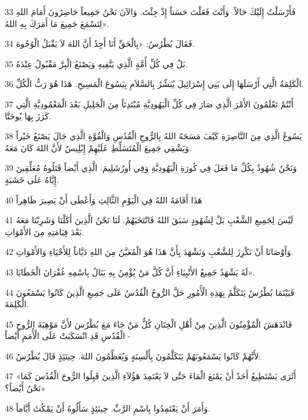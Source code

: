 \par 33 فَأَرْسَلْتُ إِلَيْكَ حَالاً. وَأَنْتَ فَعَلْتَ حَسَناً إِذْ جِئْتَ. وَالآنَ نَحْنُ جَمِيعاً حَاضِرُونَ أَمَامَ اللهِ لِنَسْمَعَ جَمِيعَ مَا أَمَرَكَ بِهِ اللهُ».
\par 34 فَقَالَ بُطْرُسُ: «بِالْحَقِّ أَنَا أَجِدُ أَنَّ اللهَ لاَ يَقْبَلُ الْوُجُوهَ.
\par 35 بَلْ فِي كُلِّ أُمَّةٍ الَّذِي يَتَّقِيهِ وَيَصْنَعُ الْبِرَّ مَقْبُولٌ عِنْدَهُ.
\par 36 الْكَلِمَةُ الَّتِي أَرْسَلَهَا إِلَى بَنِي إِسْرَائِيلَ يُبَشِّرُ بِالسَّلاَمِ بِيَسُوعَ الْمَسِيحِ. هَذَا هُوَ رَبُّ الْكُلِّ.
\par 37 أَنْتُمْ تَعْلَمُونَ الأَمْرَ الَّذِي صَارَ فِي كُلِّ الْيَهُودِيَّةِ مُبْتَدِئاً مِنَ الْجَلِيلِ بَعْدَ الْمَعْمُودِيَّةِ الَّتِي كَرَزَ بِهَا يُوحَنَّا.
\par 38 يَسُوعُ الَّذِي مِنَ النَّاصِرَةِ كَيْفَ مَسَحَهُ اللهُ بِالرُّوحِ الْقُدُسِ وَالْقُوَّةِ الَّذِي جَالَ يَصْنَعُ خَيْراً وَيَشْفِي جَمِيعَ الْمُتَسَلِّطِ عَلَيْهِمْ إِبْلِيسُ لأَنَّ اللهَ كَانَ مَعَهُ.
\par 39 وَنَحْنُ شُهُودٌ بِكُلِّ مَا فَعَلَ فِي كُورَةِ الْيَهُودِيَّةِ وَفِي أُورُشَلِيمَ. الَّذِي أَيْضاً قَتَلُوهُ مُعَلِّقِينَ إِيَّاهُ عَلَى خَشَبَةٍ.
\par 40 هَذَا أَقَامَهُ اللهُ فِي الْيَوْمِ الثَّالِثِ وَأَعْطَى أَنْ يَصِيرَ ظَاهِراً
\par 41 لَيْسَ لِجَمِيعِ الشَّعْبِ بَلْ لِشُهُودٍ سَبَقَ اللهُ فَانْتَخَبَهُمْ. لَنَا نَحْنُ الَّذِينَ أَكَلْنَا وَشَرِبْنَا مَعَهُ بَعْدَ قِيَامَتِهِ مِنَ الأَمْوَاتِ.
\par 42 وَأَوْصَانَا أَنْ نَكْرِزَ لِلشَّعْبِ وَنَشْهَدَ بِأَنَّ هَذَا هُوَ الْمُعَيَّنُ مِنَ اللهِ دَيَّاناً لِلأَحْيَاءِ وَالأَمْوَاتِ.
\par 43 لَهُ يَشْهَدُ جَمِيعُ الأَنْبِيَاءِ أَنَّ كُلَّ مَنْ يُؤْمِنُ بِهِ يَنَالُ بِاسْمِهِ غُفْرَانَ الْخَطَايَا».
\par 44 فَبَيْنَمَا بُطْرُسُ يَتَكَلَّمُ بِهَذِهِ الْأُمُورِ حَلَّ الرُّوحُ الْقُدُسُ عَلَى جَمِيعِ الَّذِينَ كَانُوا يَسْمَعُونَ الْكَلِمَةَ.
\par 45 فَانْدَهَشَ الْمُؤْمِنُونَ الَّذِينَ مِنْ أَهْلِ الْخِتَانِ كُلُّ مَنْ جَاءَ مَعَ بُطْرُسَ لأَنَّ مَوْهِبَةَ الرُّوحِ الْقُدُسِ قَدِ انْسَكَبَتْ عَلَى الْأُمَمِ أَيْضاً -
\par 46 لأَنَّهُمْ كَانُوا يَسْمَعُونَهُمْ يَتَكَلَّمُونَ بِأَلْسِنَةٍ وَيُعَظِّمُونَ اللهَ. حِينَئِذٍ قَالَ بُطْرُسُ:
\par 47 «أَتُرَى يَسْتَطِيعُ أَحَدٌ أَنْ يَمْنَعَ الْمَاءَ حَتَّى لاَ يَعْتَمِدَ هَؤُلاَءِ الَّذِينَ قَبِلُوا الرُّوحَ الْقُدُسَ كَمَا نَحْنُ أَيْضاً؟»
\par 48 وَأَمَرَ أَنْ يَعْتَمِدُوا بِاسْمِ الرَّبِّ. حِينَئِذٍ سَأَلُوهُ أَنْ يَمْكُثَ أَيَّاماً.

